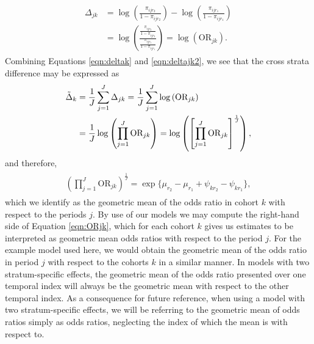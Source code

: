 \begin{align}
    \begin{split}
    \Delta_{jk} &= \log\left(\frac{\pi_{ijr_2}}{1-\pi_{ijr_2}} \right) - \log\left(\frac{\pi_{ijr_1}}{1-\pi_{ijr_1}} \right)\\  &= \log\left(\frac{\frac{\pi_{ijr_2}}{1-\pi_{ijr_2}}}{\frac{\pi_{ijr_1}}{1-\pi_{ijr_1}}}\right) = \log\left(\text{OR}_{jk}\right).
    \end{split}
    \label{eqn:deltajk2}
\end{align}
Combining Equations \eqref{eqn:deltak} and \eqref{eqn:deltajk2}, we see that the cross strata difference may be expressed as
\begin{align}
    \begin{split}
    \Tilde{\Delta}_{k} &= \frac{1}{J}\sum_{j=1}^J \Delta_{jk} = \frac{1}{J}\sum_{j=1}^J\log\left(\text{OR}_{jk}\right)\\ 
    & =\frac{1}{J}\log\left(\prod_{j=1}^J\text{OR}_{jk}\right) = \log\left(\left[\prod_{j=1}^J\text{OR}_{jk} \right]^\frac{1}{J} \right),         
    \end{split}
\end{align}
and therefore,
\begin{align}
    \begin{split}
    \left(\prod_{j=1}^J\text{OR}_{jk} \right)^\frac{1}{J} = \exp\{\mu_{r_2} - \mu_{r_1 } + \psi_{kr_2} - \psi_{kr_1}\},
    \end{split}
    \label{eqn:ORjk}
\end{align}
which we identify as the geometric mean of the odds ratio in cohort $k$ with respect to the periods $j$. By use of our models we may compute the right-hand side of Equation \eqref{eqn:ORjk}, which for each cohort $k$ gives us estimates to be interpreted as geometric mean odds ratios with respect to the period $j$. For the example model used here, we would obtain the geometric mean of the odds ratio in period $j$ with respect to the cohorts $k$ in a similar manner. In models with two stratum-specific effects, the geometric mean of the odds ratio presented over one temporal index will always be the geometric mean with respect to the other temporal index. As a consequence for future reference, when using a model with two stratum-specific effects, we will be referring to the geometric mean of odds ratios simply as odds ratios, neglecting the index of which the mean is with respect to.

